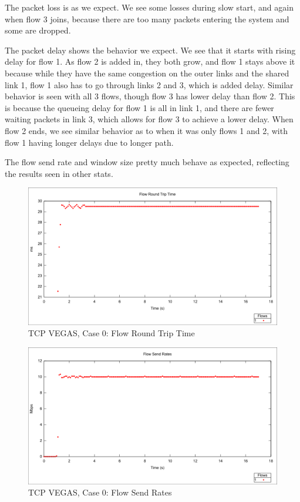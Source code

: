 The packet loss is as we expect. We see some losses during slow start, and
again when flow 3 joins, because there are too many packets entering the
system and some are dropped.

The packet delay shows the behavior we expect. We see that it starts with
rising delay for flow 1. As flow 2 is added in, they both grow, and flow 1
stays above it because while they have the same congestion on the outer links
and the shared link 1, flow 1 also has to go through links 2 and 3, which is
added delay. Similar behavior is seen with all 3 flows, though flow 3 has
lower delay than flow 2. This is because the queueing delay for flow 1 is
all in link 1, and there are fewer waiting packets in link 3, which allows
for flow 3 to achieve a lower delay. When flow 2 ends, we see similar behavior
as to when it was only flows 1 and 2, with flow 1 having longer delays due to
longer path.

The flow send rate and window size pretty much behave as expected,
reflecting the results seen in other stats.



\begin{figure}[htbp]
    \centering
    \includegraphics[width=\textwidth]{vegas0/Flow_RTT.png}
    \caption{TCP VEGAS, Case 0: Flow Round Trip Time}
\end{figure}

\begin{figure}[htbp]
    \centering
    \includegraphics[width=\textwidth]{vegas0/Flow_Send_Rates.png}
    \caption{TCP VEGAS, Case 0: Flow Send Rates}
\end{figure}

